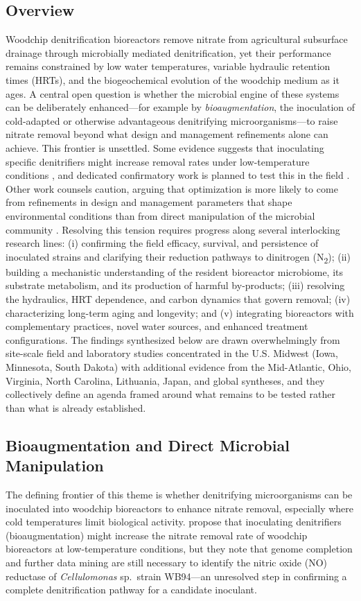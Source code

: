 \subsection{Overview}
Woodchip denitrification bioreactors remove nitrate from agricultural subsurface drainage through microbially mediated denitrification, yet their performance remains constrained by low water temperatures, variable hydraulic retention times (HRTs), and the biogeochemical evolution of the woodchip medium as it ages. A central open question is whether the microbial engine of these systems can be deliberately enhanced---for example by \emph{bioaugmentation}, the inoculation of cold-adapted or otherwise advantageous denitrifying microorganisms---to raise nitrate removal beyond what design and management refinements alone can achieve. This frontier is unsettled. Some evidence suggests that inoculating specific denitrifiers might increase removal rates under low-temperature conditions \parencite{Jang2019}, and dedicated confirmatory work is planned to test this in the field \parencite{Anderson2020}. Other work counsels caution, arguing that optimization is more likely to come from refinements in design and management parameters that shape environmental conditions than from direct manipulation of the microbial community \parencite{Hathaway2015}. Resolving this tension requires progress along several interlocking research lines: (i) confirming the field efficacy, survival, and persistence of inoculated strains and clarifying their reduction pathways to dinitrogen (N\textsubscript{2}); (ii) building a mechanistic understanding of the resident bioreactor microbiome, its substrate metabolism, and its production of harmful by-products; (iii) resolving the hydraulics, HRT dependence, and carbon dynamics that govern removal; (iv) characterizing long-term aging and longevity; and (v) integrating bioreactors with complementary practices, novel water sources, and enhanced treatment configurations. The findings synthesized below are drawn overwhelmingly from site-scale field and laboratory studies concentrated in the U.S. Midwest (Iowa, Minnesota, South Dakota) with additional evidence from the Mid-Atlantic, Ohio, Virginia, North Carolina, Lithuania, Japan, and global syntheses, and they collectively define an agenda framed around what remains to be tested rather than what is already established.

\subsection{Bioaugmentation and Direct Microbial Manipulation}
The defining frontier of this theme is whether denitrifying microorganisms can be inoculated into woodchip bioreactors to enhance nitrate removal, especially where cold temperatures limit biological activity. \textcite{Jang2019} propose that inoculating denitrifiers (bioaugmentation) might increase the nitrate removal rate of woodchip bioreactors at low-temperature conditions, but they note that genome completion and further data mining are still necessary to identify the nitric oxide (NO) reductase of \emph{Cellulomonas} sp.\ strain WB94---an unresolved step in confirming a complete denitrification pathway for a candidate inoculant.

